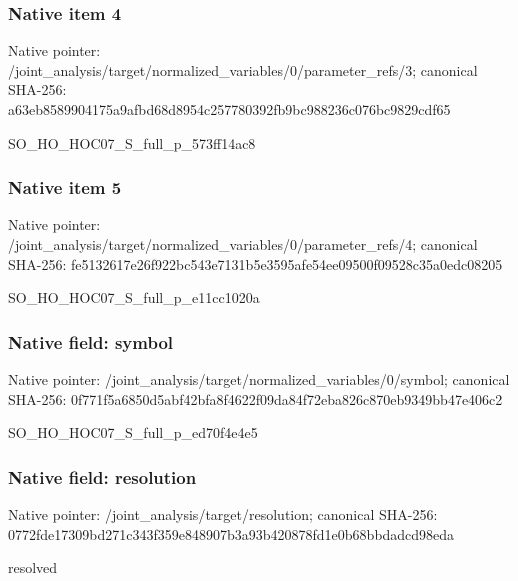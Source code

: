 \documentclass[10pt,a4paper]{article}
\begin{document}
\subsubsection{Native item 4}
Native pointer: /joint\_\allowbreak{}analysis/target/normalized\_\allowbreak{}variables/0/parameter\_\allowbreak{}refs/3; canonical SHA-256: a63eb8589904175a9afbd68d8954c257780392fb9bc988236c076bc9829cdf65

\begingroup\raggedright\sloppy SO\_\allowbreak{}HO\_\allowbreak{}HOC07\_\allowbreak{}S\_\allowbreak{}full\_\allowbreak{}p\_\allowbreak{}573ff14ac8\par\endgroup

\subsubsection{Native item 5}
Native pointer: /joint\_\allowbreak{}analysis/target/normalized\_\allowbreak{}variables/0/parameter\_\allowbreak{}refs/4; canonical SHA-256: fe5132617e26f922bc543e7131b5e3595afe54ee09500f09528c35a0edc08205

\begingroup\raggedright\sloppy SO\_\allowbreak{}HO\_\allowbreak{}HOC07\_\allowbreak{}S\_\allowbreak{}full\_\allowbreak{}p\_\allowbreak{}e11cc1020a\par\endgroup

\subsubsection{Native field: symbol}
Native pointer: /joint\_\allowbreak{}analysis/target/normalized\_\allowbreak{}variables/0/symbol; canonical SHA-256: 0f771f5a6850d5abf42bfa8f4622f09da84f72eba826c870eb9349bb47e406c2

\begingroup\raggedright\sloppy SO\_\allowbreak{}HO\_\allowbreak{}HOC07\_\allowbreak{}S\_\allowbreak{}full\_\allowbreak{}p\_\allowbreak{}ed70f4e4e5\par\endgroup

\subsubsection{Native field: resolution}
Native pointer: /joint\_\allowbreak{}analysis/target/resolution; canonical SHA-256: 0772fde17309bd271c343f359e848907b3a93b420878fd1e0b68bbdadcd98eda

\begingroup\raggedright\sloppy resolved\par\endgroup
\end{document}
